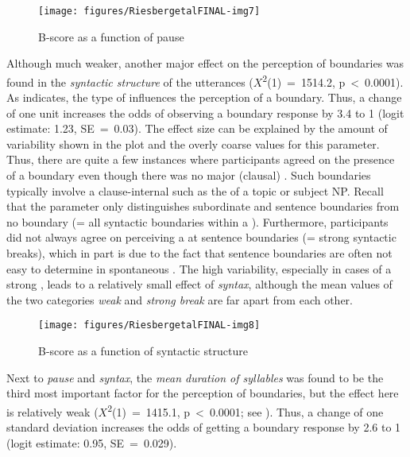 \documentclass[output=paper
,modfonts
,nonflat]{langsci/langscibook}
\begin{document}
\begin{figure}
	\texttt{[image: figures/RiesbergetalFINAL-img7]}
	\caption{B-score as a function of pause}
	\label{f:riesberg:7}
\end{figure}

\noindent
Although much weaker, another major effect on the perception of boundaries was found in the \textit{syntactic structure} of the utterances (\textit{$X$}\textsuperscript{2}(1)~=~1514.2, p~<~0.0001). As  indicates, the type of  influences the perception of a boundary. Thus, a change of one unit increases the odds of observing a boundary response by 3.4 to 1 (logit estimate: 1.23, SE~=~0.03). The effect size can be explained by the amount of variability shown in the plot and the overly coarse values for this parameter. Thus, there are quite a few instances where participants agreed on the presence of a boundary even though there was no major (clausal) . Such boundaries typically involve a clause-internal  such as the  of a topic or subject NP. Recall that the  parameter only distinguishes subordinate  and sentence boundaries from no boundary (= all syntactic boundaries within a ). Furthermore, participants did not always agree on perceiving a  at sentence boundaries (= strong syntactic breaks), which in part is due to the fact that sentence boundaries are often not easy to determine in spontaneous . The high variability, especially in cases of a strong , leads to a relatively small effect of \textit{syntax}, although the mean values of the two categories \textit{weak} and \textit{strong break} are far apart from each other.

\begin{figure}
	\texttt{[image: figures/RiesbergetalFINAL-img8]}
	\caption{B-score as a function of syntactic structure}
	\label{f:riesberg:8}
\end{figure}

\noindent
Next to \textit{pause} and \textit{syntax}, the \textit{mean duration of syllables} was found to be the third most important factor for the perception of boundaries, but the effect here is relatively weak (\textit{$X$}\textsuperscript{2}(1)~=~1415.1, p~<~0.0001; see ). Thus, a change of one standard deviation increases the odds of getting a boundary response by 2.6 to 1 (logit estimate: 0.95, SE~=~0.029).
\end{document}
